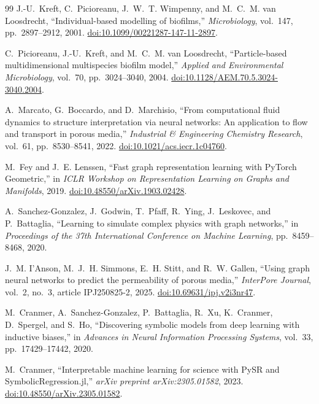 \documentclass[11pt,a4paper]{article}
\begin{document}
\begin{thebibliography}{99}
J.-U.~Kreft, C.~Picioreanu, J.~W.~T. Wimpenny, and
M.~C.~M. van Loosdrecht,
``Individual-based modelling of biofilms,''
\emph{Microbiology}, vol.~147, pp.~2897--2912, 2001.
\href{https://doi.org/10.1099/00221287-147-11-2897}
{doi:10.1099/00221287-147-11-2897}.

C.~Picioreanu, J.-U.~Kreft, and M.~C.~M. van Loosdrecht,
``Particle-based multidimensional multispecies biofilm model,''
\emph{Applied and Environmental Microbiology}, vol.~70,
pp.~3024--3040, 2004.
\href{https://doi.org/10.1128/AEM.70.5.3024-3040.2004}
{doi:10.1128/AEM.70.5.3024-3040.2004}.

A.~Marcato, G.~Boccardo, and D.~Marchisio,
``From computational fluid dynamics to structure interpretation via neural
networks: An application to flow and transport in porous media,''
\emph{Industrial \& Engineering Chemistry Research}, vol.~61,
pp.~8530--8541, 2022.
\href{https://doi.org/10.1021/acs.iecr.1c04760}
{doi:10.1021/acs.iecr.1c04760}.

M.~Fey and J.~E. Lenssen,
``Fast graph representation learning with PyTorch Geometric,''
in \emph{ICLR Workshop on Representation Learning on Graphs and Manifolds},
2019.
\href{https://doi.org/10.48550/arXiv.1903.02428}
{doi:10.48550/arXiv.1903.02428}.

A.~Sanchez-Gonzalez, J.~Godwin, T.~Pfaff, R.~Ying, J.~Leskovec,
and P.~Battaglia,
``Learning to simulate complex physics with graph networks,''
in \emph{Proceedings of the 37th International Conference on Machine
Learning}, pp.~8459--8468, 2020.

J.~M. I'Anson, M.~J.~H. Simmons, E.~H. Stitt, and R.~W. Gallen,
``Using graph neural networks to predict the permeability of porous media,''
\emph{InterPore Journal}, vol.~2, no.~3, article IPJ250825-2, 2025.
\href{https://doi.org/10.69631/ipj.v2i3nr47}
{doi:10.69631/ipj.v2i3nr47}.

M.~Cranmer, A.~Sanchez-Gonzalez, P.~Battaglia, R.~Xu, K.~Cranmer,
D.~Spergel, and S.~Ho,
``Discovering symbolic models from deep learning with inductive biases,''
in \emph{Advances in Neural Information Processing Systems}, vol.~33,
pp.~17429--17442, 2020.

M.~Cranmer,
``Interpretable machine learning for science with PySR and
SymbolicRegression.jl,''
\emph{arXiv preprint arXiv:2305.01582}, 2023.
\href{https://doi.org/10.48550/arXiv.2305.01582}
{doi:10.48550/arXiv.2305.01582}.

\end{thebibliography}
\end{document}
